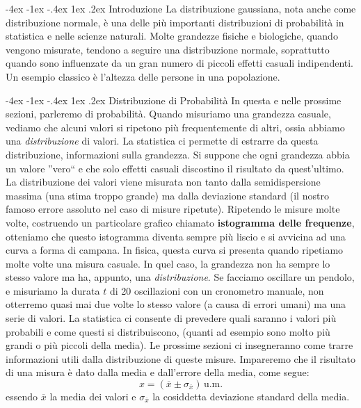 \documentclass[12pt,a4paper,oneside]{book}
\makeatletter
\renewcommand{\section}{\@startsection{section}{1}{\z@}
{-4ex \@plus -1ex \@minus -.4ex}
{1ex \@plus.2ex }
{\normalfont\large\sffamily\bfseries}}
\theoremstyle{esercizio}
\makeatother
\begin{document}
\section{Introduzione}
La distribuzione gaussiana, nota anche come distribuzione normale, è una delle più importanti distribuzioni di probabilità in statistica e nelle scienze naturali. Molte grandezze fisiche e biologiche, quando vengono misurate, tendono a seguire una distribuzione normale, soprattutto quando sono influenzate da un gran numero di piccoli effetti casuali indipendenti. Un esempio classico è l'altezza delle persone in una popolazione.

\section{Distribuzione di Probabilità}
In questa e nelle prossime sezioni, parleremo di probabilità. Quando misuriamo una grandezza casuale, vediamo che alcuni valori si ripetono più frequentemente di altri, ossia abbiamo una \textit{distribuzione} di valori. La statistica ci permette di estrarre da questa distribuzione, informazioni sulla grandezza. Si suppone che ogni grandezza abbia un valore ''vero`` e che solo effetti casuali discostino il risultato da quest'ultimo. La distribuzione dei valori viene misurata non tanto dalla semidispersione massima (una stima troppo grande) ma dalla deviazione standard (il nostro famoso errore assoluto nel caso di misure ripetute). Ripetendo le misure molte volte, costruendo un  particolare grafico chiamato \textbf{istogramma delle frequenze}, otteniamo che questo istogramma diventa sempre  più liscio e  si avvicina ad una curva a forma di campana. In fisica, questa curva si presenta quando ripetiamo molte volte una misura casuale. In quel caso, la grandezza non ha sempre lo stesso valore ma ha, appunto, una \textit{distribuzione}. Se facciamo oscillare un pendolo, e misuriamo la durata $t$ di 20 oscillazioni con un cronometro manuale, non otterremo quasi mai due volte lo stesso valore (a causa di errori umani) ma una serie di valori. La statistica ci consente di prevedere quali saranno i valori più probabili e come questi si distribuiscono, (quanti ad esempio sono molto più grandi o più piccoli della media). Le prossime sezioni ci insegneranno come trarre informazioni utili dalla distribuzione di queste misure. Impareremo che il risultato di una misura è dato dalla media e dall'errore della media, come segue:
\[
x=\left(\overline{x} \pm \sigma_{\overline{x}}\right) \, \text{u.m.}
\]
essendo $\overline{x}$ la media dei valori e $\sigma_{\overline{x}}$ la cosiddetta deviazione standard della media.
\end{document}
